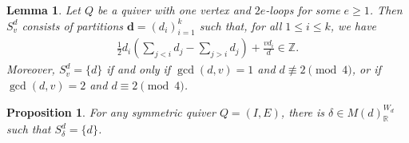 \documentclass[10pt,a4paper]{amsart}
\newtheorem{prop}{Proposition}
\newtheorem{lemma}{Lemma}
\renewcommand{\geq}{\geqslant}
\renewcommand{\leq}{\leqslant}
\begin{document}
\begin{lemma}\label{lem:onevertex}
Let $Q$ be a quiver with one vertex and $2e$-loops for some $e \geq 1$. 
Then $S_v^d$ consists of partitions $\mathbf{d}=(d_i)_{i=1}^k$ such that, for all $1\leq i\leq k$, we have 
\begin{align*}
    \frac{1}{2}d_i\left( \sum_{j<i}d_j-\sum_{j>i}d_j \right)+\frac{vd_i}{d} \in \mathbb{Z}. 
\end{align*}
Moreover,
$S_{v}^d=\{d\}$ if and only if $\gcd(d, v)=1$ and $d \not\equiv 2 \pmod 4$, 
    or if $\gcd(d, v)=2$ and $d \equiv 2 \pmod 4$. 
\end{lemma}

\begin{prop}\label{prop:delta}
For any symmetric quiver $Q=(I, E)$, there is $\delta \in M(d)_{\mathbb{R}}^{W_d}$ such that 
$S_{\delta}^d=\{d\}$. 
\end{prop}
\end{document}
